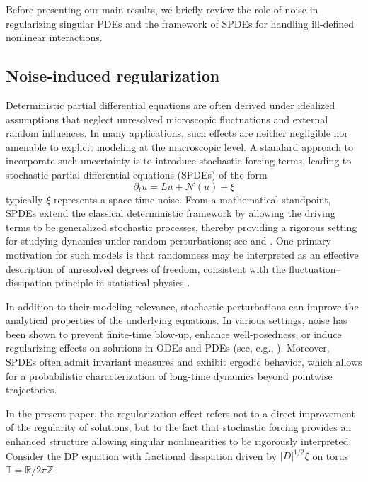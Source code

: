 \documentclass{article}
\numberwithin{equation}{section}
\newcommand{\ml}{\mathcal}
\newcommand{\p}{\partial}
\begin{document}
\par Before presenting our main results, we briefly review the role of noise in regularizing singular PDEs and the framework of SPDEs for handling ill-defined nonlinear interactions.
\subsection{Noise-induced regularization}
\par Deterministic partial differential equations are often derived under idealized assumptions that neglect unresolved microscopic fluctuations and external random influences. In many applications, such effects are neither negligible nor amenable to explicit modeling at the macroscopic level. A standard approach to incorporate such uncertainty is to introduce stochastic forcing terms, leading to stochastic partial differential equations (SPDEs) of the form
\begin{equation}
    \p_t u=Lu+\ml N(u)+\xi
\end{equation}
typically $\xi$ represents a space-time noise. From a mathematical standpoint, SPDEs extend the classical deterministic framework by allowing the driving terms to be generalized stochastic processes, thereby providing a rigorous setting for studying dynamics under random perturbations; see \cite{walsh2006introduction} and \cite{da2014stochastic}. One primary motivation for such models is that randomness may be interpreted as an effective description of unresolved degrees of freedom, consistent with the fluctuation–dissipation principle in statistical physics \cite{kubo1966fluctuation}.
\par In addition to their modeling relevance, stochastic perturbations can improve the analytical properties of the underlying equations. In various settings, noise has been shown to prevent finite-time blow-up, enhance well-posedness, or induce regularizing effects on solutions in ODEs and PDEs (see, e.g., \cite{catellier2016rough,catellier2016averaging,athreya2024well,flandoli2010well}).  Moreover, SPDEs often admit invariant measures and exhibit ergodic behavior, which allows for a probabilistic characterization of long-time dynamics beyond pointwise trajectories.
\par In the present paper,  the regularization effect refers not to a direct improvement of the regularity of solutions, but to the fact that stochastic forcing provides an enhanced structure allowing singular nonlinearities to be rigorously interpreted.  Consider the DP equation with fractional disspation driven by $|D|^{1/2}\xi$ on torus $\mathbb T=\mathbb R/2\pi\mathbb Z$ 
\end{document}

